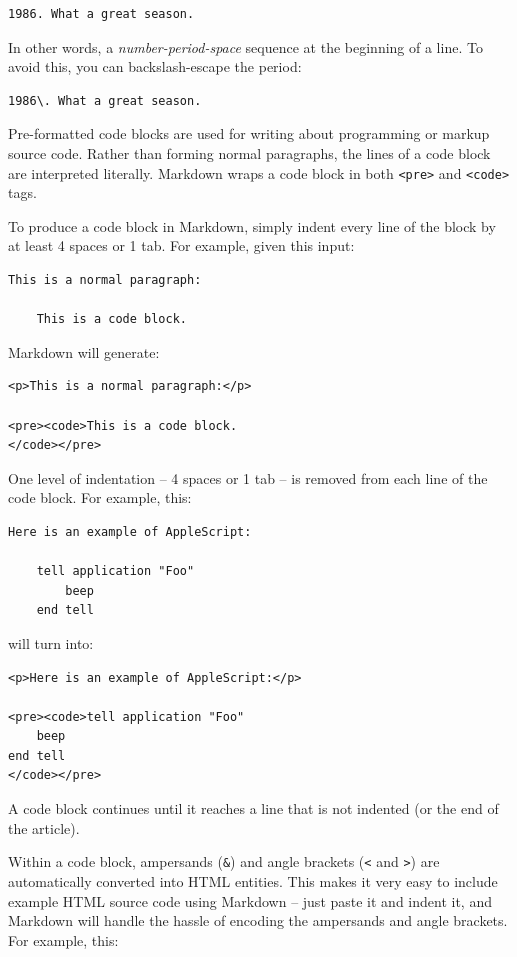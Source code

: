\begin{verbatim}
1986. What a great season.
\end{verbatim}

In other words, a \emph{number-period-space} sequence at the beginning of a
line. To avoid this, you can backslash-escape the period:

\begin{verbatim}
1986\. What a great season.
\end{verbatim}

Pre-formatted code blocks are used for writing about programming or
markup source code. Rather than forming normal paragraphs, the lines
of a code block are interpreted literally. Markdown wraps a code block
in both \texttt{<pre>} and \texttt{<code>} tags.

To produce a code block in Markdown, simply indent every line of the
block by at least 4 spaces or 1 tab. For example, given this input:

\begin{verbatim}
This is a normal paragraph:

    This is a code block.
\end{verbatim}

Markdown will generate:

\begin{verbatim}
<p>This is a normal paragraph:</p>

<pre><code>This is a code block.
</code></pre>
\end{verbatim}

One level of indentation -- 4 spaces or 1 tab -- is removed from each
line of the code block. For example, this:

\begin{verbatim}
Here is an example of AppleScript:

    tell application "Foo"
        beep
    end tell
\end{verbatim}

will turn into:

\begin{verbatim}
<p>Here is an example of AppleScript:</p>

<pre><code>tell application "Foo"
    beep
end tell
</code></pre>
\end{verbatim}

A code block continues until it reaches a line that is not indented
(or the end of the article).

Within a code block, ampersands (\texttt{\&}) and angle brackets (\texttt{<} and \texttt{>})
are automatically converted into HTML entities. This makes it very
easy to include example HTML source code using Markdown -- just paste
it and indent it, and Markdown will handle the hassle of encoding the
ampersands and angle brackets. For example, this:

